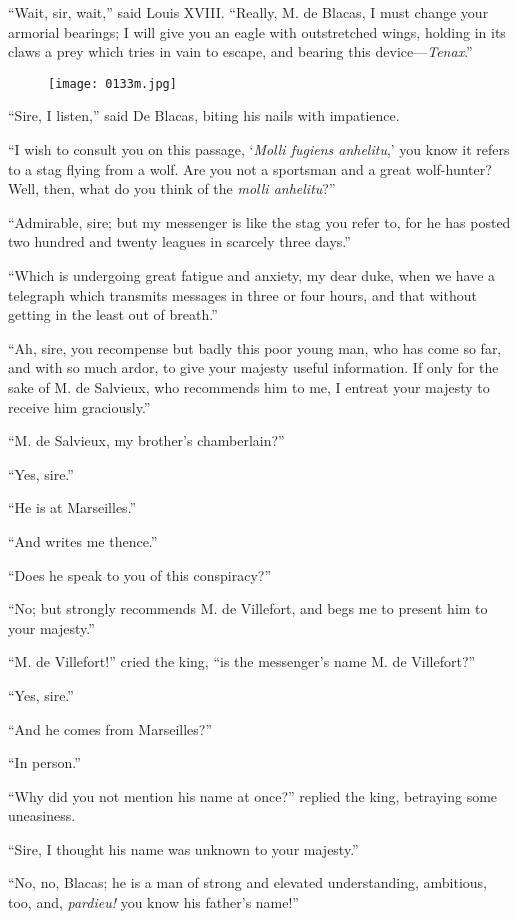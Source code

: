 “Wait, sir, wait,” said Louis XVIII. “Really, M. de Blacas, I must
change your armorial bearings; I will give you an eagle with
outstretched wings, holding in its claws a prey which tries in vain to
escape, and bearing this device—\textit{Tenax}.”

\begin{figure}[h]
\texttt{[image: 0133m.jpg]}
\end{figure}

“Sire, I listen,” said De Blacas, biting his nails with impatience.

“I wish to consult you on this passage, ‘\textit{Molli fugiens anhelitu},’ you
know it refers to a stag flying from a wolf. Are you not a sportsman
and a great wolf-hunter? Well, then, what do you think of the \textit{molli
anhelitu}?”

“Admirable, sire; but my messenger is like the stag you refer to, for
he has posted two hundred and twenty leagues in scarcely three days.”

“Which is undergoing great fatigue and anxiety, my dear duke, when we
have a telegraph which transmits messages in three or four hours, and
that without getting in the least out of breath.”

“Ah, sire, you recompense but badly this poor young man, who has come
so far, and with so much ardor, to give your majesty useful
information. If only for the sake of M. de Salvieux, who recommends him
to me, I entreat your majesty to receive him graciously.”

“M. de Salvieux, my brother’s chamberlain?”

“Yes, sire.”

“He is at Marseilles.”

“And writes me thence.”

“Does he speak to you of this conspiracy?”

“No; but strongly recommends M. de Villefort, and begs me to present
him to your majesty.”

“M. de Villefort!” cried the king, “is the messenger’s name M. de
Villefort?”

“Yes, sire.”

“And he comes from Marseilles?”

“In person.”

“Why did you not mention his name at once?” replied the king, betraying
some uneasiness.

“Sire, I thought his name was unknown to your majesty.”

“No, no, Blacas; he is a man of strong and elevated understanding,
ambitious, too, and, \textit{pardieu!} you know his father’s name!”

